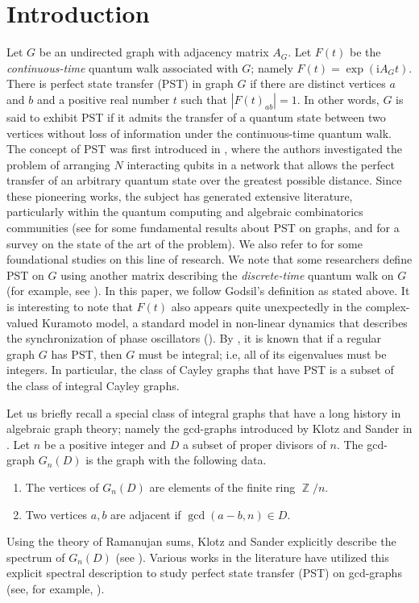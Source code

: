 \documentclass[12pt, a4paper]{amsart}
\theoremstyle{definition}
\DeclareMathOperator{\Z}{\mathbb{Z}}
\numberwithin{equation}{section}
\begin{document}
\section{\textbf{Introduction}}
Let $G$ be an undirected graph with adjacency matrix $A_G$. Let $F(t)$ be the \textit{continuous-time} quantum walk associated with $G$; namely $F(t) = \exp(\mathrm{i}A_Gt).$ There is perfect state transfer (PST) in graph $G$ if there are distinct vertices $a$ and $b$ and a positive real number $t$ such that $|F(t)_{ab}| = 1$. In other words, \(G\) is said to exhibit PST if it admits the transfer of a quantum state between two vertices without loss of information under the continuous-time quantum walk. The concept of PST was first introduced in \cite{landahn1, landahn}, where the authors investigated the problem of arranging \(N\) interacting qubits in a network that allows the perfect transfer of an arbitrary quantum state over the greatest possible distance. Since these pioneering works, the subject has generated extensive literature, particularly within the quantum computing and algebraic combinatorics communities (see \cite{godsil2012state} for some fundamental results about PST on graphs, and \cite{arnadottir2022state} for a survey on the state of the art of the problem). We also refer to \cite{BP1, BP2, BP3, pst-gcd-new-2, pst-gcd-new} for some foundational studies on this line of research. We note that some researchers define PST on $G$ using another matrix describing the \textit{discrete-time} quantum walk on $G$ (for example, see \cite{bhakta2025state}). In this paper, we follow Godsil's definition as stated above. It is interesting to note that $F(t)$ also appears quite unexpectedly in the complex-valued Kuramoto model, a standard model in non-linear dynamics that describes the synchronization of phase oscillators (\cite{budzinski2021simple, muller2021algebraic}).  By \cite[Theorem 5.2]{godsil2012state}, it is known that if a regular graph $G$ has PST, then $G$ must be integral; i.e, all of its eigenvalues must be integers. In particular, the class of Cayley graphs that have PST is a subset of the class of integral Cayley graphs. 




Let us briefly recall a special class of integral graphs that have a long history in algebraic graph theory; namely the gcd-graphs introduced by Klotz and Sander in \cite{klotz2007some}. Let $n$ be a positive integer and $D$ a subset of proper divisors of $n$. The gcd-graph $G_n(D)$ is the graph with the following data.
\begin{enumerate}
\item The vertices of $G_n(D)$ are elements of the finite ring $\Z/n$.
\item Two vertices $a,b$ are adjacent if $\gcd(a-b, n) \in D.$ 
\end{enumerate}
Using the theory of Ramanujan sums, Klotz and Sander explicitly describe the spectrum of $G_n(D)$ (see \cite[Section 4]{klotz2007some}). Various works in the literature have utilized this explicit spectral description to study perfect state transfer (PST) on gcd-graphs (see, for example, \cite{bavsic2009perfect, godsil2012state, saxena2007parameters}).
\end{document}
